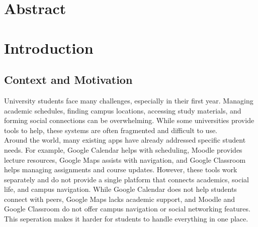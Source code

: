 \documentclass[12pt]{article}
\begin{document}
\newpage
\listoffigures
{}
\renewcommand{\listtablename}{LIST OF TABLES}
\renewcommand{\cftlottitlefont}{\Large\bfseries} 
\renewcommand{\cftafterlottitle}{
    \par\noindent\vspace{-0.5em}
    \textcolor{blue}{\rule{\textwidth}{0.5pt}}
    \vspace{1em} 
}
\renewcommand{\cfttabpresnum}{Table~}
\renewcommand{\cfttabaftersnum}{:}
\setlength{\cfttabnumwidth}{5em}
\newpage

\listoftables
{}
\newpage
\section*{Abstract}


\newpage

\section{Introduction}

\subsection{Context and Motivation}
University students face many challenges, especially in their first year. Managing academic schedules, finding campus locations, accessing study materials, and forming social connections can be overwhelming.
While some universities provide tools to help, these systems are often fragmented and difficult to use. \\

Around the world, many existing apps have already addressed specific student needs. 
For example, Google Calendar helps with scheduling, Moodle provides lecture resources, Google Maps assists with navigation, and Google Classroom helps managing assignments and course updates.
However, these tools work separately and do not provide a single platform that connects academics, social life, and campus navigation.
While Google Calendar does not help students connect with peers, Google Maps lacks academic support, and Moodle and Google Classroom do not offer campus navigation or social networking features.
This seperation makes it harder for students to handle everything in one place. \\
\end{document}
